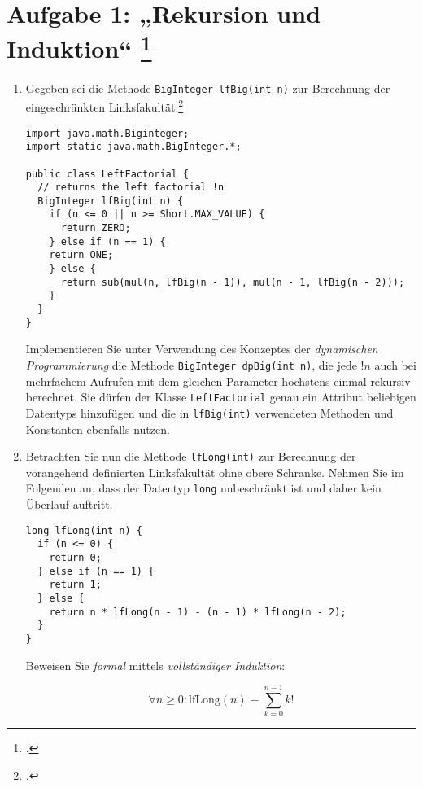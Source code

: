 \documentclass{lehramt-informatik-aufgabe}
\begin{document}

\section{Aufgabe 1: „Rekursion und Induktion“
\footcite[Thema 1 Aufgabe 1b Seite 2-3]{examen:66115:2014:03}}

\begin{enumerate}
\item Gegeben sei die Methode \verb|BigInteger lfBig(int n)| zur
Berechnung der eingeschränkten Linksfakultät:\footcite[Seite 25]{aud:fs:1}

\begin{verbatim}
import java.math.Biginteger;
import static java.math.BigInteger.*;

public class LeftFactorial {
  // returns the left factorial !n
  BigInteger lfBig(int n) {
    if (n <= 0 || n >= Short.MAX_VALUE) {
      return ZERO;
    } else if (n == 1) {
    return ONE;
    } else {
      return sub(mul(n, lfBig(n - 1)), mul(n - 1, lfBig(n - 2)));
    }
  }
}
\end{verbatim}

Implementieren Sie unter Verwendung des Konzeptes der \emph{dynamischen
Programmierung} die Methode \verb|BigInteger dpBig(int n)|, die jede
$!n$
auch bei mehrfachem Aufrufen mit dem gleichen Parameter höchstens einmal
rekursiv berechnet. Sie dürfen der Klasse \verb|LeftFactorial| genau ein
Attribut beliebigen Datentyps hinzufügen und die in \verb|lfBig(int)|
verwendeten Methoden und Konstanten ebenfalls nutzen.

\item Betrachten Sie nun die Methode \verb|lfLong(int)| zur Berechnung
der vorangehend definierten Linksfakultät ohne obere Schranke. Nehmen
Sie im Folgenden an, dass der Datentyp \verb|long| unbeschränkt ist und
daher kein Überlauf auftritt.

\begin{verbatim}
long lfLong(int n) {
  if (n <= 0) {
    return 0;
  } else if (n == 1) {
    return 1;
  } else {
    return n * lfLong(n - 1) - (n - 1) * lfLong(n - 2);
  }
}
\end{verbatim}

Beweisen Sie \emph{formal} mittels \emph{vollständiger Induktion}:

\def\lf#1{\text{lfLong}(#1)}
\def\sk#1{\sum^{#1}_{k=0}k!}

\begin{displaymath}
\forall n \geq 0: \lf{n} \equiv \sk{n-1}
\end{displaymath}


\end{enumerate}
\end{document}
